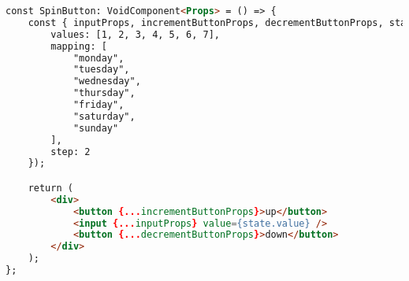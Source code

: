 \clearpage

\begin{lstlisting}[caption={Ukázka použití createSpinButton funkce}, label={spinbutton-example}, language=html]
const SpinButton: VoidComponent<Props> = () => {
    const { inputProps, incrementButtonProps, decrementButtonProps, state } = createSpinButton({
        values: [1, 2, 3, 4, 5, 6, 7],
        mapping: [
            "monday",
            "tuesday",
            "wednesday",
            "thursday",
            "friday",
            "saturday",
            "sunday"
        ],
        step: 2
    });

    return (
        <div>
            <button {...incrementButtonProps}>up</button>
            <input {...inputProps} value={state.value} />
            <button {...decrementButtonProps}>down</button>
        </div>
    );
};
\end{lstlisting}